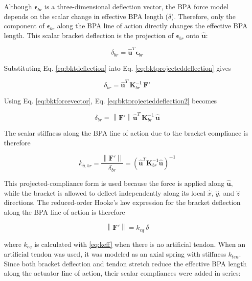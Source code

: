Although $\boldsymbol{\epsilon}_{br}$ is a three-dimensional deflection vector, the BPA force model depends on the scalar change in effective BPA length ($\delta$). Therefore, only the component of $\boldsymbol{\epsilon}_{br}$ along the BPA line of action directly changes the effective BPA length. This scalar bracket deflection is the projection of $\boldsymbol{\epsilon}_{br}$ onto $\hat{\mathbf{u}}$:

\begin{equation}
{\delta}_{br} = \hat{\mathbf{u}}^{T} \boldsymbol{\epsilon}_{br}
\label{eq:bktprojecteddeflection}
\end{equation}

Substituting Eq. \ref{eq:bktdeflection} into Eq. \ref{eq:bktprojecteddeflection} gives

\begin{equation}
{\delta}_{br} = \hat{\mathbf{u}}^{T} \, \mathbf{K}_{br}^{-1} \, \mathbf{F}'
\label{eq:bktprojecteddeflection2}
\end{equation}

Using Eq. \ref{eq:bktforcevector}, Eq. \ref{eq:bktprojecteddeflection2} becomes

\begin{equation}
\delta_{br} = \left\| \mathbf{F}' \right\| \hat{\mathbf{u}}^{T} \, \mathbf{K}_{br}^{-1} \, \hat{\mathbf{u}}
\label{eq:bktprojectedcompliance}
\end{equation}

The scalar stiffness along the BPA line of action due to the bracket compliance is therefore

\begin{equation}
k_{\hat{u},br} = \frac{\left\| \mathbf{F}' \right\|}{\delta_{br}} = \left( \hat{\mathbf{u}}^{T} \mathbf{K}_{br}^{-1} \hat{\mathbf{u}} \right)^{-1}
\label{eq:keff}
\end{equation}

This projected-compliance form is used because the force is applied along $\hat{\mathbf{u}}$, while the bracket is allowed to deflect independently along its local $\hat{x}$, $\hat{y}$, and $\hat{z}$ directions. The reduced-order Hooke's law expression for the bracket deflection along the BPA line of action is therefore

\begin{equation} \left\| \mathbf{F}' \right\| = k_{eq} \: \delta
\label{eq:hookereduced}
\end{equation}

where $k_{eq}$ is calculated with \eqref{eq:keff} when there is no artificial tendon. When an artificial tendon was used, it was modeled as an axial spring with stiffness $k_{ten}$. Since both bracket deflection and tendon stretch reduce the effective BPA length along the actuator line of action, their scalar compliances were added in series:

